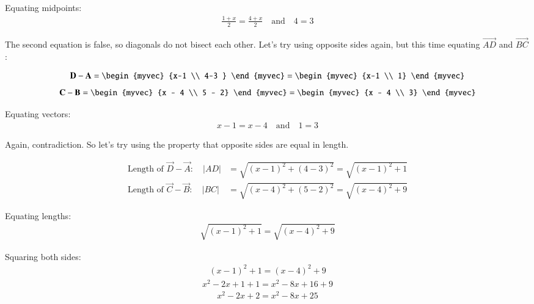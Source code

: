 \documentclass[journal]{IEEEtran}
\begin{document}
Equating midpoints:
\begin{align}
\frac{1 + x}{2} = \frac{4 + x}{2} \quad \text{and} \quad 4 = 3
\end{align}

The second equation is false, so diagonals do not bisect each other. Let's try using opposite sides again, but this time equating $ \vec{AD} $ and $ \vec{BC} $:

\begin{align}
\vec{D} -\vec{A} = \begin{myvec}
    {x-1 \\ 4-3 } \end{myvec} =\begin{myvec}
        {x-1 \\ 1}
    \end{myvec}
 \end{align}   
 \begin{align}
\vec{C} -\vec{B} = \begin{myvec}
    {x - 4 \\ 5 - 2} \end{myvec} =\begin{myvec}
         {x - 4 \\ 3}
     \end{myvec}
\end{align}

Equating vectors:
\begin{align}
x - 1 = x - 4 \quad \text{and} \quad 1 = 3
\end{align}

Again, contradiction. So let's try using the property that opposite sides are equal in length.

\begin{align}
	\text{Length of } \vec{D}-\vec{A}: \quad |AD| &= \sqrt{(x - 1)^2 + (4 - 3)^2} = \sqrt{(x - 1)^2 + 1} \\
	\text{Length of } \vec{C}-\vec{B}: \quad |BC| &= \sqrt{(x - 4)^2 + (5 - 2)^2} = \sqrt{(x - 4)^2 + 9}
\end{align}

Equating lengths:
\begin{align}
\sqrt{(x - 1)^2 + 1} = \sqrt{(x - 4)^2 + 9}
\end{align}

Squaring both sides:
\begin{align}
(x - 1)^2 + 1 = (x - 4)^2 + 9
\end{align}
\begin{align}
x^2 - 2x + 1 + 1 = x^2 - 8x + 16 + 9
\end{align}
\begin{align}
x^2 - 2x + 2 = x^2 - 8x + 25
\end{align}
\end{document}
